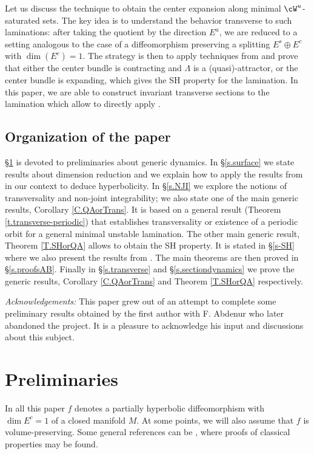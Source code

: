 \documentclass[a4paper,11pt]{amsart}
\numberwithin{equation}{section}     %
\theoremstyle{definition}
\theoremstyle{remark}
\begin{document}
Let us discuss the technique to obtain the center expansion along minimal $\cW^u$-saturated sets. The key idea is to understand the behavior transverse to such laminations: after taking the quotient by the direction $E^u$, we are reduced to a setting analogous to the case of a diffeomorphism preserving a splitting $E^s\oplus E^c$ with $\dim(E^c)=1$.
The strategy is then to apply techniques from \cite{PS-IHP, CPS} and prove that either the center bundle is contracting and $\Lambda$ is a (quasi)-attractor, or the center bundle is expanding, which gives the SH property for the lamination. In this paper, we are able to construct invariant transverse sections to the lamination which allow to directly apply \cite{PS-IHP}.

\subsection*{Organization of the paper}
\S\ref{s.prelim} is devoted to preliminaries about generic dynamics. In \S\ref{s.surface} we state results about dimension reduction and we explain how to apply the results from \cite{PS-IHP} in our context to deduce hyperbolicity.
In \S\ref{s.NJI} we explore the notions of transversality and non-joint integrability; we also state one of the main generic results, Corollary \ref{C.QAorTrans}. It is based on a general result (Theorem \ref{t.transverse-periodic}) that establishes transversality or existence of a periodic orbit for a general minimal unstable lamination. The other main generic result, Theorem \ref{T.SHorQA} allows to obtain the SH property. It is stated in \S\ref{s-SH} where we also present the results from \cite{ACW}.
The main theorems are then proved in \S\ref{s.proofsAB}. Finally in \S\ref{s.transverse} and \S\ref{s.sectiondynamics} we prove the generic results, Corollary \ref{C.QAorTrans} and Theorem \ref{T.SHorQA} respectively.
\medskip 
\medskip

{\small {\em Acknowledgements:} This paper grew out of an attempt to complete some preliminary results obtained by the first author with F. Abdenur who later abandoned the project. It is a pleasure to acknowledge his input and discussions about this subject. }

\section{Preliminaries}\label{s.prelim}
In all this paper $f$ denotes a partially hyperbolic diffeomorphism with $\dim E^c =1$ of a closed manifold $M$. At some points, we will also  assume that $f$ is volume-preserving. Some general references can be \cite{BDV,Crov-habilitation,CroPot}, where proofs of classical properties may be found.
\end{document}
